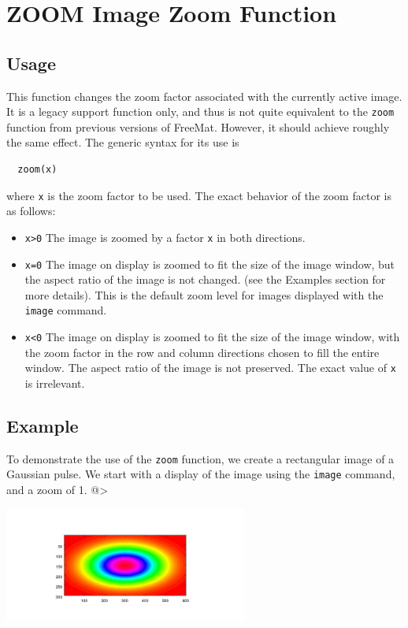 \section{ZOOM Image Zoom Function}

\subsection{Usage}

This function changes the zoom factor associated with the currently active
image.  It is a legacy support function only, and thus is not quite equivalent
to the \verb|zoom| function from previous versions of FreeMat.  However, it should
achieve roughly the same effect. The generic syntax for its use is
\begin{verbatim}
  zoom(x)
\end{verbatim}
where \verb|x| is the zoom factor to be used.  The exact behavior of the zoom
factor is as follows:
\begin{itemize}
\item  \verb|x>0| The image is zoomed by a factor \verb|x| in both directions.

\item  \verb|x=0| The image on display is zoomed to fit the size of the image window, but
  the aspect ratio of the image is not changed.  (see the Examples section for
more details).  This is the default zoom level for images displayed with the
\verb|image| command.

\item  \verb|x<0| The image on display is zoomed to fit the size of the image window, with
  the zoom factor in the row and column directions chosen to fill the entire window.
  The aspect ratio of the image is not preserved.  The exact value of \verb|x| is
  irrelevant.

\end{itemize}
\subsection{Example}

To demonstrate the use of the \verb|zoom| function, we create a rectangular image 
of a Gaussian pulse.  We start with a display of the image using the \verb|image|
command, and a zoom of 1.
@>


\centerline{\includegraphics[width=8cm]{zoom1}}


